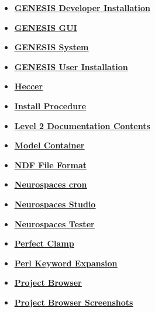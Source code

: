 \documentclass[12pt]{article}
\begin{document}
\begin{itemize}
\item \href{../installation-developer/installation-developer.pdf}{\bf \underline{GENESIS Developer Installation}}

\item \href{../gui/gui.pdf}{\bf \underline{GENESIS GUI}}

\item \href{../genesis-system/genesis-system.pdf}{\bf \underline{GENESIS System}}

\item \href{../installation-user/installation-user.pdf}{\bf \underline{GENESIS User Installation}}

\item \href{../heccer/heccer.pdf}{\bf \underline{Heccer}}

\item \href{../install-procedure/install-procedure.pdf}{\bf \underline{Install Procedure}}

\item \href{../contents-level2/contents-level2.pdf}{\bf \underline{Level 2 Documentation Contents}}

\item \href{../model-container/model-container.pdf}{\bf \underline{Model Container}}

\item \href{../ndf-file-format/ndf-file-format.pdf}{\bf \underline{NDF File Format}}

\item \href{../neurospaces-cron/neurospaces-cron.pdf}{\bf \underline{Neurospaces cron}}

\item \href{../studio/studio.pdf}{\bf \underline{Neurospaces Studio}}

\item \href{../neurospaces-tester/neurospaces-tester.pdf}{\bf \underline{Neurospaces Tester}}

\item \href{../pclamp/pclamp.pdf}{\bf \underline{Perfect Clamp}}

\item \href{../release-expand/release-expand.pdf}{\bf \underline{Perl Keyword Expansion}}

\item \href{../project-browser/project-browser.pdf}{\bf \underline{Project Browser}}

\item \href{../project-browser-screenshots/project-browser-screenshots.pdf}{\bf \underline{Project Browser Screenshots}}


\end{itemize}
\end{document}
